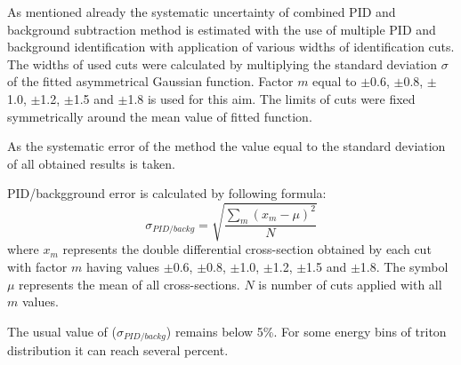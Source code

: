 As mentioned already the systematic uncertainty of combined PID 
and background subtraction method is estimated with 
the use of multiple PID and background identification 
with application of various widths of identification cuts.  
The widths of used cuts were calculated by multiplying 
the standard deviation $\sigma$ of the fitted asymmetrical Gaussian function.
Factor $m$ equal to $\pm$0.6, $\pm$0.8, $\pm$1.0, $\pm$1.2, $\pm$1.5 and $\pm$1.8 is used for this aim. 
The limits of cuts were fixed symmetrically around the mean value of fitted function.

As the systematic error of the method the value equal to the standard deviation  of all obtained results is taken.

PID/backgground error is calculated by following formula:
\begin{equation}
    \sigma_{PID/backg}=\sqrt{\frac{\sum_m (x_m-\mu)^2 }{N}}
\end{equation}
where $x_m$ represents the double differential cross-section obtained by each cut with factor $m$ having values  $\pm$0.6, $\pm$0.8, $\pm$1.0, $\pm$1.2, $\pm$1.5 and $\pm$1.8. The symbol $\mu$ represents the mean of all cross-sections. $N$ is number of cuts applied with all $m$ values. 

The usual value of ($\sigma_{PID/backg}$) remains below 5\%. For some energy bins of triton distribution it can reach  several percent.  





